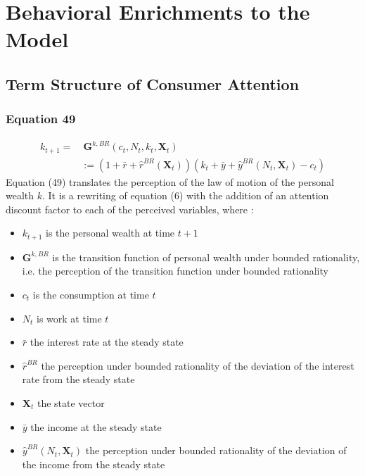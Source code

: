 \documentclass{article}
\begin{document}
\section{Behavioral Enrichments to the Model}

\subsection{Term Structure of Consumer Attention}

\subsubsection*{Equation 49}

\begin{equation} \tag{49}
    \begin{split}
        k_{t+1}= &\  \textbf{G}^{k,BR}(c_{t},N_{t},k_{t},\textbf{X}_{t}) \\
        & := (1+\bar{r}+\hat{r}^{BR}(\textbf{X}_t))(k_{t}+\bar{y}+\hat{y}^{BR}(N_{t},\textbf{X}_t)-c_{t})
    \end{split}
\end{equation}
Equation (49) translates the perception of the law of motion of the personal wealth $k$. It is a rewriting of equation (6) with the addition of an attention discount factor to each of the perceived variables, where : 
\begin{itemize}
    \item $k_{t+1}$ is the personal wealth at time $t+1$
    \item $\textbf{G}^{k,BR}$ is the transition function of personal wealth under bounded rationality, i.e. the perception of the transition function under bounded rationality
    \item $c_t$ is the consumption at time $t$
    \item $N_{t}$ is work at time $t$
    \item $\bar{r}$ the interest rate at the steady state
    \item $\hat{r}^{BR}$ the perception under bounded rationality of the deviation of the interest rate from the steady state 
    \item $\textbf{X}_t$ the state vector
    \item $\bar{y}$ the income at the steady state 
    \item $\hat{y}^{BR}(N_t,\textbf{X}_{t})$ the perception under bounded rationality of the deviation of the income from the steady state
\end{itemize}
\end{document}
